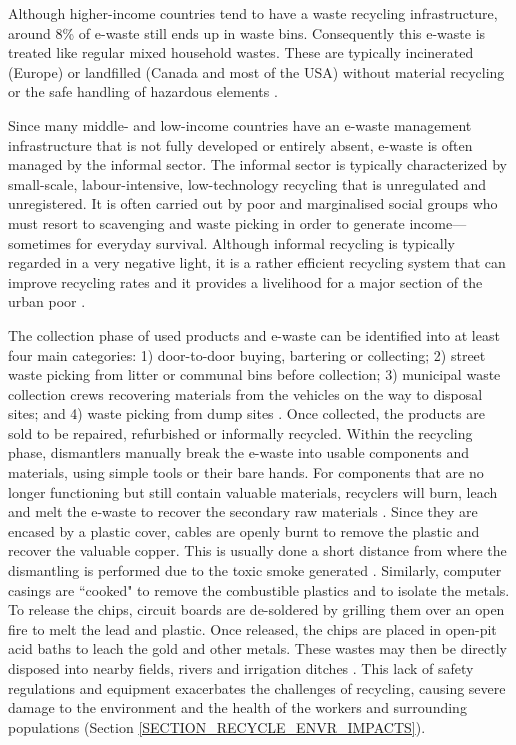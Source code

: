 \documentclass{article}
\newcounter{subsubsubsection}[subsubsection]
\begin{document}
Although higher-income countries tend to have a waste recycling infrastructure, around 8\% of e-waste still ends up in waste bins. Consequently this e-waste is treated like regular mixed household wastes. These are typically incinerated (Europe) or landfilled (Canada and most of the USA) without material recycling or the safe handling of hazardous elements \cite{forti2020global}. 

Since many middle- and low-income countries have an e-waste management infrastructure that is not fully developed or entirely absent, e-waste is often managed by the informal sector. The informal sector is typically characterized by small-scale, labour-intensive, low-technology recycling that is unregulated and unregistered. It is often carried out by poor and marginalised social groups who must resort to scavenging and waste picking in order to generate income---sometimes for everyday survival. Although informal recycling is typically regarded in a very negative light, %
it is a rather efficient recycling system that can improve recycling rates and it provides a livelihood for a major section of the urban poor \cite{wilson2006role, medina2000scavenger}.

The collection phase of used products and e-waste can be identified into at least four main categories: 1) door-to-door buying, bartering or collecting; 2) street waste picking from litter or communal bins before collection; 3) municipal waste collection crews recovering materials from the vehicles on the way to disposal sites; and 4) waste picking from dump sites \cite{wilson2006role}. Once collected, the products are sold to be repaired, refurbished or informally recycled. Within the recycling phase, dismantlers manually break the e-waste into usable components and materials, using simple tools or their bare hands. For components that are no longer functioning but still contain valuable materials, recyclers will burn, leach and melt the e-waste to recover the secondary raw materials \cite{forti2020global}. Since they are encased by a plastic cover, cables are openly burnt to remove the plastic and recover the valuable copper. This is usually done a short distance from where the dismantling is performed due to the toxic smoke generated \cite{akormedi2013working}. Similarly, computer casings are ``cooked" to remove the combustible plastics and to isolate the metals. To release the chips, circuit boards are de-soldered by grilling them over an open fire to melt the lead and plastic. Once released, the chips are placed in open-pit acid baths to leach the gold and other metals. These wastes may then be directly disposed into nearby fields, rivers and irrigation ditches \cite{chan2013review, sthiannopkao2013handling}. This lack of safety regulations and equipment exacerbates the challenges of recycling, causing severe damage to the environment and the health of the workers and surrounding populations (Section \ref{SECTION_RECYCLE_ENVR_IMPACTS}).
\end{document}
